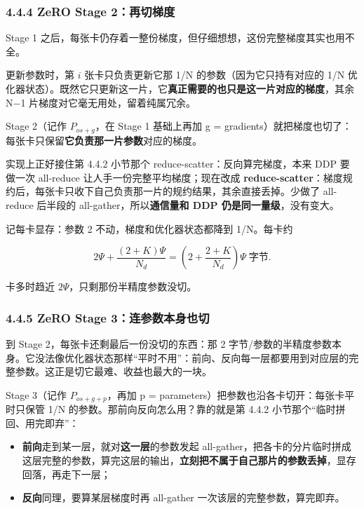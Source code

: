 \documentclass[
  chinese,
]{ctexart}
\providecommand{\tightlist}{%
  \setlength{\itemsep}{0pt}\setlength{\parskip}{0pt}}
\begin{document}
\subsubsection{4.4.4 ZeRO Stage
2：再切梯度}\label{zero-stage-2ux518dux5207ux68afux5ea6}

Stage 1
之后，每张卡仍存着一整份梯度，但仔细想想，这份完整梯度其实也用不全。

更新参数时，第 \(i\) 张卡只负责更新它那 1/N 的参数（因为它只持有对应的
1/N
优化器状态）。既然它只更新这一片，它\textbf{真正需要的也只是这一片对应的梯度}，其余
N−1 片梯度对它毫无用处，留着纯属冗余。

Stage 2（记作 \(P_{os+g}\)，在 Stage 1 基础上再加 g =
gradients）就把梯度也切了：每张卡只保留\textbf{它负责那一片参数}对应的梯度。

实现上正好接住第 4.4.2 小节那个 reduce-scatter：反向算完梯度，本来 DDP
要做一次 all-reduce 让人手一份完整平均梯度；现在改成
\textbf{reduce-scatter}：梯度规约后，每张卡只收下自己负责那一片的规约结果，其余直接丢掉。少做了
all-reduce 后半段的 all-gather，所以\textbf{通信量和 DDP
仍是同一量级}，没有变大。

记每卡显存：参数 2 不动，梯度和优化器状态都降到 1/N。每卡约

\[
2\Psi + \frac{(2+K)\Psi}{N_d} = \left(2 + \frac{2+K}{N_d}\right)\Psi \;\text{字节}.
\]

卡多时趋近 \(2\Psi\)，只剩那份半精度参数没切。

\subsubsection{4.4.5 ZeRO Stage
3：连参数本身也切}\label{zero-stage-3ux8fdeux53c2ux6570ux672cux8eabux4e5fux5207}

到 Stage 2，每张卡还剩最后一份没切的东西：那 2
字节/参数的半精度参数本身。它没法像优化器状态那样``平时不用''：前向、反向每一层都要用到对应层的完整参数。这正是切它最难、收益也最大的一块。

Stage 3（记作 \(P_{os+g+p}\)，再加 p =
parameters）把参数也沿各卡切开：每张卡平时只保管 1/N
的参数。那前向反向怎么用？靠的就是第 4.4.2
小节那个``临时拼回、用完即弃''：

\begin{itemize}
\tightlist
\item
  \textbf{前向}走到某一层，就对\textbf{这一层}的参数发起
  all-gather，把各卡的分片临时拼成这层完整的参数，算完这层的输出，\textbf{立刻把不属于自己那片的参数丢掉}，显存回落，再走下一层；
\item
  \textbf{反向}同理，要算某层梯度时再 all-gather
  一次该层的完整参数，算完即弃。
\end{itemize}
\end{document}
